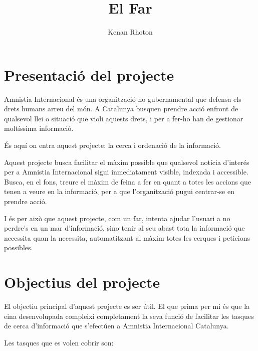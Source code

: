 \documentclass{article}
\title{El Far}
\author{Kenan Rhoton}
\begin{document}
\maketitle

\section{Presentació del projecte}

Amnistia Internacional és una organització no gubernamental que defensa els drets humans arreu del món. A Catalunya busquen prendre acció enfront de qualsevol llei o situació que violi aquests drets, i per a fer-ho han de gestionar moltíssima informació.

És aquí on entra aquest projecte: la cerca i ordenació de la informació.

Aquest projecte busca facilitar el màxim possible que qualsevol notícia d'interés per a Amnistia Internacional sigui inmediatament visible, indexada i accessible. Busca, en el fons, treure el màxim de feina a fer en quant a totes les accions que tenen a veure en la informació, per a que l'organització pugui centrar-se en prendre acció.

I és per això que aquest projecte, com un far, intenta ajudar l'usuari a no perdre's en un mar d'informació, sino tenir al seu abast tota la informació que necessita quan la necessita, automatitzant al màxim totes les cerques i peticions possibles.

\newpage

\tableofcontents

\newpage

\section{Objectius del projecte}

El objectiu principal d'aquest projecte es ser útil. El que prima per mi és que la eina desenvolupada compleixi completament la seva funció de facilitar les tasques de cerca d'informació que s'efectúen a Amnistia Internacional Catalunya.

Les tasques que es volen cobrir son:
\end{document}
